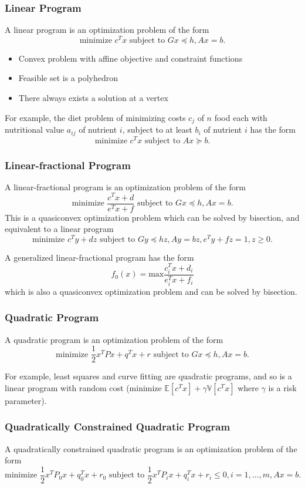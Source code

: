 \documentclass[11pt]{article}
\begin{document}
\subsubsection*{Linear Program} 
A linear program is an optimization problem of the form 
\[ \text{minimize } c^Tx \text{ subject to } Gx \preceq h, Ax = b. \]
\begin{itemize}
    \item Convex problem with affine objective and constraint functions 
    \item Feasible set is a polyhedron
    \item There always exists a solution at a vertex
\end{itemize}
For example, the diet problem of minimizing costs $c_j$ of $n$ food each with nutritional value $a_{ij}$ of nutrient $i$, subject to at least $b_i$ of nutrient $i$ has the form 
\[ \text{minimize } c^Tx \text{ subject to } Ax \succeq b. \] 

\subsubsection*{Linear-fractional Program} 
A linear-fractional program is an optimization problem of the form
\[ \text{minimize } \frac{c^Tx + d}{e^Tx + f} \text{ subject to } Gx \preceq h, Ax=b. \]
This is a quasiconvex optimization problem which can be solved by bisection, and equivalent to a linear program 
\[ \text{minimize } c^Ty + dz \text{ subject to } Gy \preceq hz, Ay=bz, e^Ty + fz = 1, z \geq 0. \] 

A generalized linear-fractional program has the form 
\[ f_0(x) = \mathrm{max} \frac{c_i^Tx + d_i}{e_i^Tx + f_i} \] 
which is also a quasiconvex optimization problem and can be solved by bisection.

\subsubsection*{Quadratic Program} 
A quadratic program is an optimization problem of the form 
\[ \text{minimize } \frac{1}{2}x^TPx + q^Tx + r \text{ subject to } Gx \preceq h, Ax=b. \]

For example, least squares and curve fitting are quadratic programs, and so is a linear program with random cost (minimize $\mathbb{E}[c^Tx] + \gamma\mathbb{V}[c^Tx]$ where $\gamma$ is a risk parameter). 

\subsubsection*{Quadratically Constrained Quadratic Program}
A quadratically constrained quadratic program is an optimization problem of the form
\[ \text{minimize } \frac{1}{2}x^TP_0x + q_0^Tx + r_0 \text{ subject to } \frac{1}{2}x^TP_ix + q_i^Tx + r_i \leq 0, i = 1, \ldots, m, Ax=b. \] 
\end{document}

